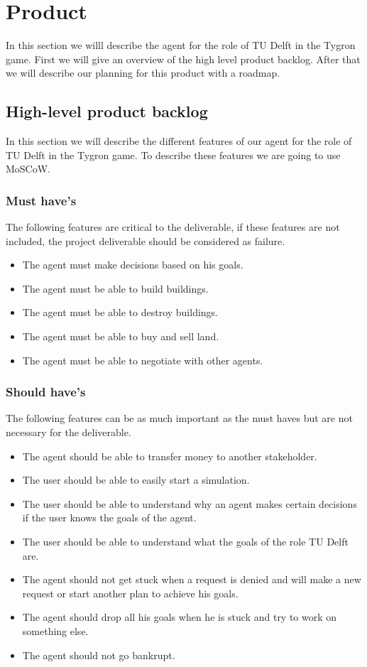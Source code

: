 \section{Product}

In this section we willl describe the agent for the role of TU Delft in the Tygron game. First we will give an overview of the high level product backlog. After that we will describe our planning for this product with a roadmap.

\subsection{High-level product backlog}
In this section we will describe the different features of our agent for the role of TU Delft in the Tygron game. To describe these features we are going to use MoSCoW.

\subsubsection{Must have's}
The following features are critical to the deliverable, if these features are not included, the project deliverable should be considered as failure.
\begin{itemize}
	\item The agent must make decisions based on his goals.
	\item The agent must be able to build buildings.
	\item The agent must be able to destroy buildings.
	\item The agent must be able to buy and sell land.
	\item  The agent must be able to negotiate with other agents.
\end{itemize}

\subsubsection{Should have's}
The following features can be as much important as the must haves but are not necessary for the deliverable.
\begin{itemize}
	\item  The agent should be able to transfer money to another stakeholder.
	\item The user should be able to easily start a simulation.
	\item The user should be able to understand why an agent makes certain decisions if the user knows the goals of the agent.
	\item The user should be able to understand what the goals of the role TU Delft are.
	\item The agent should not get stuck when a request is denied and will make a new request or start another plan to achieve his goals.
	\item The agent should drop all his goals when he is stuck and try to work on something else. 
	\item The agent should not go bankrupt.
\end{itemize}

